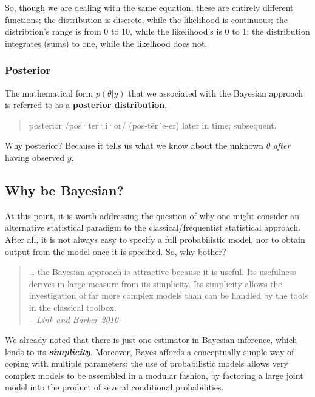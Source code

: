 \documentclass[11pt]{article}
\begin{document}
    So, though we are dealing with the same equation, these are entirely
different functions; the distribution is discrete, while the likelihood
is continuous; the distribtion's range is from 0 to 10, while the
likelihood's is 0 to 1; the distribution integrates (sums) to one, while
the likelhood does not.

    \hypertarget{posterior}{%
\subsubsection{Posterior}\label{posterior}}

The mathematical form \(p(\theta | y)\) that we associated with the
Bayesian approach is referred to as a \textbf{posterior distribution}.

\begin{quote}
posterior /pos·ter·i·or/ (pos-tēr´e-er) later in time; subsequent.
\end{quote}

Why posterior? Because it tells us what we know about the unknown
\(\theta\) \emph{after} having observed \(y\).

    \hypertarget{why-be-bayesian}{%
\subsection{Why be Bayesian?}\label{why-be-bayesian}}

At this point, it is worth addressing the question of why one might
consider an alternative statistical paradigm to the
classical/frequentist statistical approach. After all, it is not always
easy to specify a full probabilistic model, nor to obtain output from
the model once it is specified. So, why bother?

\begin{quote}
\ldots{} the Bayesian approach is attractive because it is useful. Its
usefulness derives in large measure from its simplicity. Its simplicity
allows the investigation of far more complex models than can be handled
by the tools in the classical toolbox.\\
\emph{-- Link and Barker 2010}
\end{quote}

We already noted that there is just one estimator in Bayesian inference,
which lends to its \textbf{\emph{simplicity}}. Moreover, Bayes affords a
conceptually simple way of coping with multiple parameters; the use of
probabilistic models allows very complex models to be assembled in a
modular fashion, by factoring a large joint model into the product of
several conditional probabilities.
\end{document}
